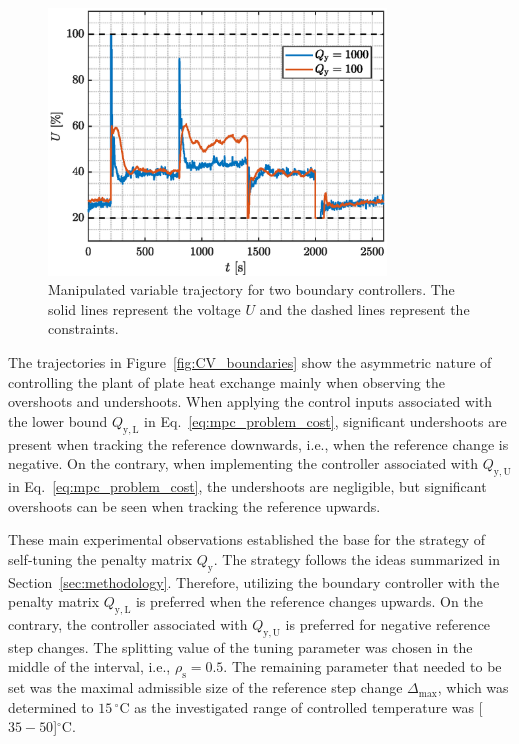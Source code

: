\documentclass[preprint,12pt]{elsarticle}
\begin{document}
	\begin{figure}
		\begin{center}
			\includegraphics[width=0.8\textwidth]{images/MV_boundaries}
			\caption{Manipulated variable trajectory for two boundary controllers. The solid lines represent the voltage $U$ and the dashed lines represent the constraints.}
			\label{fig:MV_boundaries}
		\end{center}
	\end{figure}
	
	The trajectories in Figure~\ref{fig:CV_boundaries} show the asymmetric nature of controlling the plant of plate heat exchange mainly when observing the overshoots and undershoots. When applying the control inputs associated with the lower bound $Q_\mathrm{y, L}$ in Eq.~\eqref{eq:mpc_problem_cost}, significant undershoots are present when tracking the reference downwards, i.e., when the reference change is negative. On the contrary, when implementing the controller associated with $Q_\mathrm{y, U}$ in Eq.~\eqref{eq:mpc_problem_cost}, the undershoots are negligible, but significant overshoots can be seen when tracking the reference upwards.
	
	These main experimental observations established the base for the strategy of self-tuning the penalty matrix $Q_\mathrm{y}$. The strategy follows the ideas summarized in Section~\ref{sec:methodology}. Therefore, utilizing the boundary controller with the penalty matrix $Q_\mathrm{y, L}$ is preferred when the reference changes upwards. On the contrary, the controller associated with $Q_\mathrm{y, U}$ is preferred for negative reference step changes. The splitting value of the tuning parameter was chosen in the middle of the interval, i.e., $\rho_{\mathrm{s}} = 0.5$. The remaining parameter that needed to be set was the maximal admissible size of the reference step change $\Delta_{\max}$, which was determined to $15\,^{\circ}\mathrm{C}$ as the investigated range of controlled temperature was [$35-50$]$^{\circ}\mathrm{C}$. 
	
\end{document}
